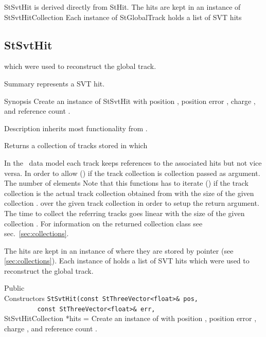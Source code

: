 \begin{Entry}
    StSvtHit is derived directly from StHit.
    The hits are kept in an instance of StSvtHitCollection
    Each instance of StGlobalTrack holds a list of SVT hits
\subsection{StSvtHit}
 
    which were used to reconstruct the global track. 
\begin{Entry}
\item[Summary]
     represents a SVT hit.

\item[Synopsis]
    Create an instance of StSvtHit with position ,
    position error , charge , and reference count .

\item[Description]    
     inherits most functionality from .
    
    Returns a collection of tracks stored in  which

    In the \StEvent\ data model each track keeps references to the
    associated hits but not vice versa. In order to allow
    () if the track collection is
    collection passed as argument.  The number of elements
      Note that this functions has to iterate
    () if the track collection is
    the actual track collection obtained from
    with the size of the given collection .
    over the given track collection in order to setup the return
    argument. The time to collect the referring tracks goes linear
    with the size of the given collection .
    For information on the returned collection class see sec.~\ref{sec:collections}.
    
    The hits are kept in an instance of 
    where they are stored by pointer (see \ref{sec:collections}).
    Each instance of  holds a list of SVT hits
    which were used to reconstruct the global track.

\item[Public\\ Constructors]
    \verb+StSvtHit(const StThreeVector<float>& pos,+\\
    \verb+         const StThreeVector<float>& err,+\\
    StSvtHitCollection *hits = 
    Create an instance of  with position ,
    position error , charge , and reference count .


\end{Entry}
\end{Entry}
